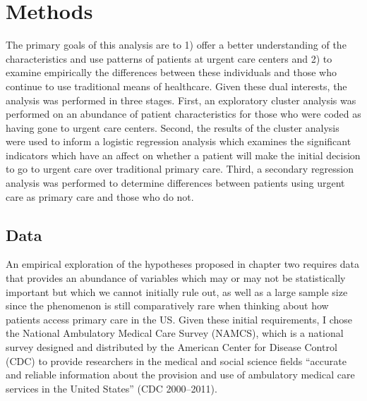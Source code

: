 \documentclass[12pt,twoside]{reedthesis}
\begin{document}
  \chapter{Methods}\label{methods}
  
  \setcounter{chapter}{4} \setcounter{section}{0} \doublespacing
  
  The primary goals of this analysis are to 1) offer a better
  understanding of the characteristics and use patterns of patients at
  urgent care centers and 2) to examine empirically the differences
  between these individuals and those who continue to use traditional
  means of healthcare. Given these dual interests, the analysis was
  performed in three stages. First, an exploratory cluster analysis was
  performed on an abundance of patient characteristics for those who were
  coded as having gone to urgent care centers. Second, the results of the
  cluster analysis were used to inform a logistic regression analysis
  which examines the significant indicators which have an affect on
  whether a patient will make the initial decision to go to urgent care
  over traditional primary care. Third, a secondary regression analysis
  was performed to determine differences between patients using urgent
  care as primary care and those who do not.
  
  \section*{Data}\label{data}
  
  An empirical exploration of the hypotheses proposed in chapter two
  requires data that provides an abundance of variables which may or may
  not be statistically important but which we cannot initially rule out,
  as well as a large sample size since the phenomenon is still
  comparatively rare when thinking about how patients access primary care
  in the US. Given these initial requirements, I chose the National
  Ambulatory Medical Care Survey (NAMCS), which is a national survey
  designed and distributed by the American Center for Disease Control
  (CDC) to provide researchers in the medical and social science fields
  ``accurate and reliable information about the provision and use of
  ambulatory medical care services in the United States'' (CDC
  2000--2011).
  
\end{document}
